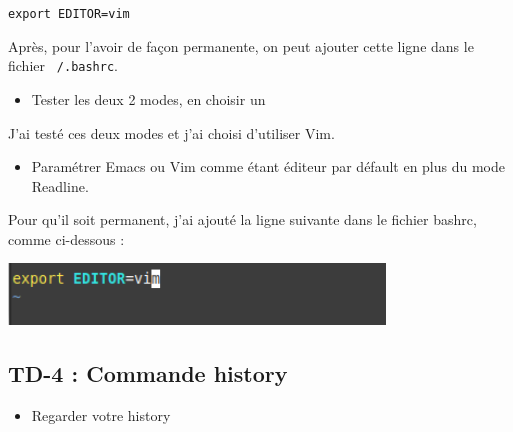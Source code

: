 \documentclass[12pt]{article}
\begin{document}
\vspace{0.3cm}

\texttt{export EDITOR=vim}

\vspace{0.3cm}

Après, pour l'avoir de façon permanente, on peut ajouter cette ligne dans le fichier \texttt{~/.bashrc}.

\vspace{0.3cm}

\begin{itemize}
  \item Tester les deux 2 modes, en choisir un
\end{itemize}

\vspace{0.3cm}

J'ai testé ces deux modes et j'ai choisi d'utiliser Vim.

\vspace{0.3cm}

\begin{itemize}
  \item Paramétrer Emacs ou Vim comme étant éditeur par défault en plus du mode Readline.
\end{itemize}

\vspace{0.3cm}

Pour qu'il soit permanent, j'ai ajouté la ligne suivante dans le fichier bashrc, comme ci-dessous :

\vspace{0.3cm}

\begin{center}
  \includegraphics[width=10cm]{Images-TD-Env-Efficiency/Image-TD-3/Ajout-ligne-bashrc.png}
\end{center}

\newpage

  \subsection{TD-4 : Commande history}

\begin{itemize}
  \item Regarder votre history
\end{itemize}
\end{document}
